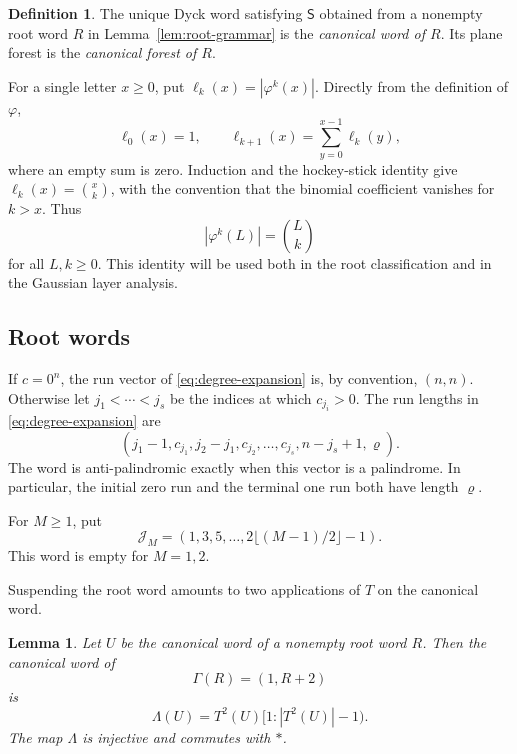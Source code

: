 \documentclass[11pt]{article}
\newtheorem{lemma}[theorem]{Lemma}
\theoremstyle{definition}
\newtheorem{definition}[theorem]{Definition}
\theoremstyle{remark}
\newcommand{\Star}{*}
\newcommand{\Lam}{\Lambda}
\begin{document}
\begin{definition}
The unique Dyck word satisfying \(\mathsf S\) obtained from a nonempty root
word \(R\) in Lemma~\ref{lem:root-grammar} is the \emph{canonical word of
\(R\)}.  Its plane forest is the \emph{canonical forest of \(R\)}.
\end{definition}

For a single letter \(x\geq0\), put
\(\ell_k(x)=|\varphi^k(x)|\).  Directly from the definition of \(\varphi\),
\[
 \ell_0(x)=1,
 \qquad
 \ell_{k+1}(x)=\sum_{y=0}^{x-1}\ell_k(y),
\]
where an empty sum is zero.  Induction and the hockey-stick identity give
\(\ell_k(x)=\binom{x}{k}\), with the convention that the binomial coefficient
vanishes for \(k>x\).  Thus
\begin{equation}
\label{eq:phi-binomial-length}
 |\varphi^k(L)|=\binom Lk
\end{equation}
for all \(L,k\geq0\).  This identity will be used both in the root
classification and in the Gaussian layer analysis.

\subsection{Root words}

If \(c=0^n\), the run vector of \eqref{eq:degree-expansion} is, by convention,
\((n,n)\).  Otherwise let \(j_1<\cdots<j_s\) be the indices at which
\(c_{j_i}>0\).  The run lengths in \eqref{eq:degree-expansion} are
\begin{equation}
\label{eq:run-vector}
 (j_1-1,c_{j_1},j_2-j_1,c_{j_2},\ldots,
 c_{j_s},n-j_s+1,\varrho).
\end{equation}
The word is anti-palindromic exactly when this vector is a palindrome.  In
particular, the initial zero run and the terminal one run both have length
\(\varrho\).

For \(M\geq1\), put
\[
 \mathcal J_M=(1,3,5,\ldots,2\lfloor(M-1)/2\rfloor-1).
\]
This word is empty for \(M=1,2\).

Suspending the root word amounts to two applications of $T$ on the canonical word.
\begin{lemma}
\label{lem:root-suspension}
Let \(U\) be the canonical word of a nonempty root word \(R\).  Then the
canonical word of
\[
 \Gamma(R)=(1,R+2)
\]
is
\[
 \Lam(U)=T^2(U)[1:|T^2(U)|-1).
\]
The map \(\Lam\) is injective and commutes with \(\Star\).
\end{lemma}
\end{document}
